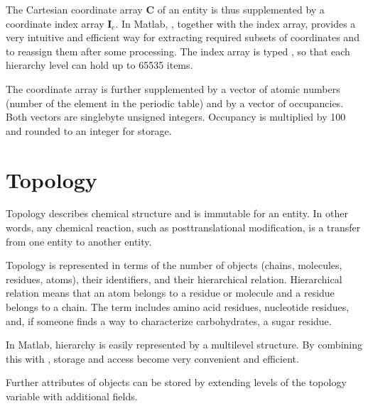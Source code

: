 \documentclass[letterpaper,10pt,english]{sphinxmanual}
\begin{document}
The Cartesian coordinate array \(\mathbf{C}\) of an entity is thus supplemented by a coordinate index array \(\mathbf{I}_\mathrm{c}\).
In Matlab, , together with the index array, provides a very intuitive and efficient way for extracting required subsets of coordinates and to reassign them after some processing.
The index array is typed , so that each hierarchy level can hold up to 65535 items.

The coordinate array is further supplemented by a vector of atomic numbers (number of the element in the periodic table) and by a vector of occupancies. Both vectors are single\sphinxhyphen{}byte unsigned integers. Occupancy is multiplied by 100 and rounded to an integer for storage.


\section{Topology}
\label{\detokenize{MMMx_atomic:topology}}
Topology describes chemical structure and is immutable for an entity. In other words, any chemical reaction, such as posttranslational modification, is a transfer from one entity to another entity.

Topology is represented in terms of the number of objects (chains, molecules, residues, atoms), their identifiers, and their hierarchical relation.
Hierarchical relation means that an atom belongs to a residue or molecule and a residue belongs to a chain. The term  includes amino acid residues, nucleotide residues, and, if someone finds a way to characterize carbohydrates, a sugar residue.

In Matlab, hierarchy is easily represented by a multi\sphinxhyphen{}level structure. By combining this with , storage and access become very convenient and efficient.

Further attributes of objects can be stored by extending levels of the topology variable with additional fields.
\end{document}
